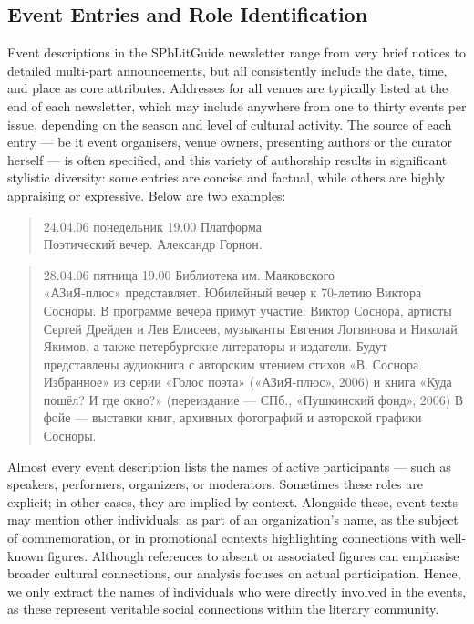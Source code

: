 \documentclass{jcls}
\begin{document}
\subsection{Event Entries and Role Identification}
Event descriptions in the SPbLitGuide newsletter range from very brief notices to detailed multi-part announcements, but all consistently include the date, time, and place as core attributes. Addresses for all venues are typically listed at the end of each newsletter, which may include anywhere from one to thirty events per issue, depending on the season and level of cultural activity. The source of each entry — be it event organisers, venue owners, presenting authors or the curator herself — is often specified, and this variety of authorship results in significant stylistic diversity: some entries are concise and factual, while others are highly appraising or expressive. Below are two examples:
\begin{quote}
24.04.06 понедельник 19.00 Платформа \\
Поэтический вечер. Александр Горнон.
\end{quote}

\begin{quote}
    28.04.06 пятница 19.00 Библиотека им. Маяковского \\
    «АЗиЯ-плюс» представляет. Юбилейный вечер к 70-летию Виктора Сосноры. В программе вечера примут участие: Виктор Соснора, артисты Сергей Дрейден и Лев Елисеев, музыканты Евгения Логвинова и Николай Якимов, а также петербургские литераторы и издатели. Будут представлены аудиокнига с авторским чтением стихов «В. Соснора. Избранное» из серии «Голос поэта» («АЗиЯ-плюс», 2006) и книга «Куда пошёл? И где окно?» (переиздание — СПб., «Пушкинский фонд», 2006) В фойе — выставки книг, архивных фотографий и авторской графики Сосноры.
\end{quote}
Almost every event description lists the names of active participants — such as speakers, performers, organizers, or moderators. Sometimes these roles are explicit; in other cases, they are implied by context. Alongside these, event texts may mention other individuals: as part of an organization’s name, as the subject of commemoration, or in promotional contexts highlighting connections with well-known figures. Although references to absent or associated figures can emphasise broader cultural connections, our analysis focuses on actual participation. Hence, we only extract the names of individuals who were directly involved in the events, as these represent veritable social connections within the literary community. 
\end{document}
